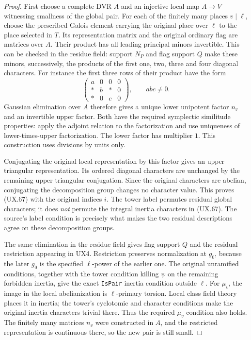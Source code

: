 \begin{proof}
First choose a complete DVR $A$ and an injective local
map $A\to V$ witnessing smallness of the global pair.
For each of the finitely many places $v\mid\ell$, choose
the prescribed Galois element carrying the original
place over $\ell$ to the place selected in $T$.
Its representation matrix and the original ordinary flag
are matrices over $A$.  Their product has all leading
principal minors invertible.  This can be checked in
the residue field: support $N_P$ and flag support $Q$
make these minors, successively, the products of the
first one, two, three and four diagonal characters.
For instance the first three rows of their product have
the form
\[
 \begin{pmatrix}
  a&0&0&0\\ *&b&*&0\\ *&0&c&0
 \end{pmatrix},\qquad abc\ne0.
 \tag{UX.69}
\]
Gaussian elimination over $A$ therefore gives a unique
lower unipotent factor $n_v$ and an invertible upper
factor.  Both have the required symplectic similitude
properties: apply the adjoint relation to the
factorization and use uniqueness of lower-times-upper
factorization.  The lower factor has multiplier $1$.
This construction uses divisions by units only.

Conjugating the original local representation by this
factor gives an upper triangular representation.  Its
ordered diagonal characters are unchanged by the
remaining upper triangular conjugation.  Since the
original characters are abelian, conjugating the
decomposition group changes no character value.
This proves (UX.67) with the original indices $i$.
The tower label permutes residual global characters;
it does \emph{not} permute the integral inertia characters
in (UX.67).  The source's label condition is precisely
what makes the two residual descriptions agree on
these decomposition groups.

The same elimination in the residue field gives flag
support $Q$ and the residual restriction appearing in
UX4.  Restriction preserves normalization at $g_0$,
because the later $g_0$ is the specified $\ell$-power
of the earlier one.  The original unramified conditions,
together with the tower condition killing $\psi$ on
the remaining forbidden inertia, give the exact
\texttt{IsPair} inertia condition outside $\ell$.
For $\mu_v$, the image in the local abelianization is
$\ell$-primary torsion.  Local class field theory places
it in inertia; the tower's cyclotomic and character
conditions make the original inertia characters
trivial there.  Thus the required $\mu_v$ condition
also holds.  The finitely many matrices $n_v$ were
constructed in $A$, and the restricted representation
is continuous there, so the new pair is still small.


\end{proof}
